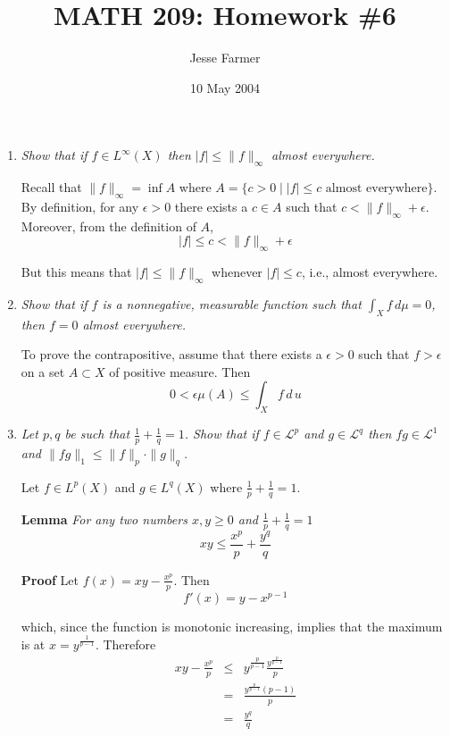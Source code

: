 \documentclass[letterpaper,11pt]{article}
\title{MATH 209: Homework \#6}
\author{Jesse Farmer}
\date{10 May 2004}
\begin{document}
\maketitle
\begin{enumerate}

\item \emph{Show that if $f \in L^\infty(X)$ then $|f| \leq \|f\|_\infty$ almost everywhere.}

Recall that $\|f\|_\infty = \inf A$ where $A = \{c > 0 \mid |f| \leq c \mbox{ almost everywhere}\}$.  By definition, for any $\epsilon > 0$ there exists a $c \in A$ such that $c < \|f\|_\infty + \epsilon$.  Moreover, from the definition of $A$,
\[
|f| \leq c < \|f\|_\infty + \epsilon
\]

But this means that $|f| \leq \|f\|_\infty$ whenever $|f| \leq c$, i.e., almost everywhere.

\item \emph{Show that if $f$ is a nonnegative, measurable function such that $\int_X f \,d\mu = 0$, then $f = 0$ almost everywhere.}

To prove the contrapositive, assume that there exists a $\epsilon > 0$ such that $f > \epsilon$ on a set $A \subset X$ of positive measure.  Then
\[
0 < \epsilon \mu(A) \leq \int_X f \,d\,u
\]

\item \emph{Let $p,q$ be such that $\frac{1}{p} + \frac{1}{q} = 1$.  Show that if $f \in \mathcal{L}^p$ and $g \in \mathcal{L}^q$ then $fg \in \mathcal{L}^1$ and $\|fg\|_1 \leq \|f\|_p \cdot \|g\|_q$.}

Let $f \in L^p(X)$ and $g \in L^q(X)$ where $\frac{1}{p} + \frac{1}{q} = 1$.

\textbf{Lemma} \emph{For any two numbers $x,y \geq 0$ and $\frac{1}{p} + \frac{1}{q} = 1$
\begin{equation}
\label{youngs}
xy \leq \frac{x^p}{p} + \frac{y^q}{q}
\end{equation}}

\textbf{Proof} Let $f(x) = xy - \frac{x^p}{p}$.  Then
\[
f'(x) = y - x^{p-1}
\]

which, since the function is monotonic increasing, implies that the maximum is at $x = y^{\frac{1}{p-1}}$.  Therefore
\begin{eqnarray*}
xy - \frac{x^p}{p} &\leq& y^{\frac{p}{p-1}} \frac{y^{\frac{p}{p-1}}}{p} \\
&=& \frac{y^{\frac{p}{p-1}}(p-1)}{p} \\
&=& \frac{y^q}{q}
\end{eqnarray*}


\end{enumerate}
\end{document}
